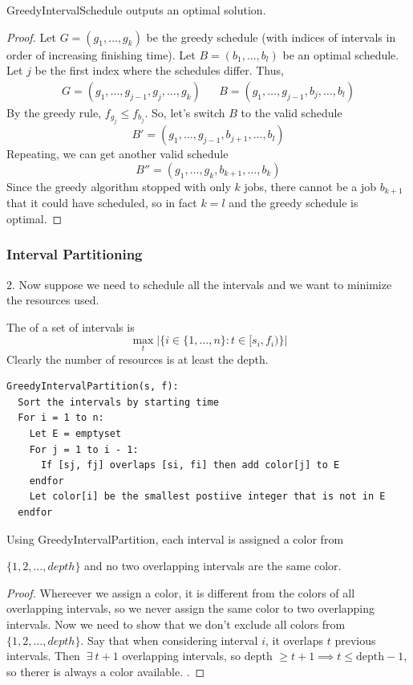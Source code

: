 \documentclass[12pt]{scrartcl}
\begin{document}
\begin{theorem}
  GreedyIntervalSchedule outputs an optimal solution. 
  \begin{proof}
    Let $G = (g_1, \ldots, g_k)$ be the greedy schedule (with indices of intervals in order of increasing finishing time). 
    Let $B = (b_1, \ldots, b_l)$ be an optimal schedule. Let $j$ be the first index where the schedules differ. Thus, 
    \begin{align*}
      G = (g_1, \ldots, g_{j-1}, g_j, \ldots, g_k) && B = (g_1, \ldots, g_{j-1}, b_j, \ldots, b_l)
    \end{align*} 
    By the greedy rule, $f_{g_j} \leq f_{b_j}$. So, let's switch $B$ to the valid schedule
    \[B' = (g_1, \ldots, g_{j-1}, b_{j+1}, \ldots, b_l)\]
    Repeating, we can get another valid schedule 
    \[B'' = (g_1, \ldots, g_k, b_{k+1}, \ldots, b_k)\]
    Since the greedy algorithm stopped with only $k$ jobs, there cannot be a job $b_{k+1}$ that it could have 
    scheduled, so in fact $k = l$ and the greedy schedule is optimal. 
  \end{proof}
\end{theorem}

\subsubsection{Interval Partitioning}

2. Now suppose we need to schedule all the intervals and we want to minimize the resources used. 

\begin{definition}
  The  of a set of intervals is 
  \[\max_t |\{i \in \{1, \ldots, n\} : t \in [s_i, f_i) \}|\]
  Clearly the number of resources is at least the depth. 

\begin{lstlisting}
GreedyIntervalPartition(s, f):
  Sort the intervals by starting time
  For i = 1 to n:
    Let E = emptyset
    For j = 1 to i - 1:
      If [sj, fj] overlaps [si, fi] then add color[j] to E
    endfor
    Let color[i] be the smallest postiive integer that is not in E
  endfor
\end{lstlisting} 
\end{definition}

\begin{theorem}
  Using GreedyIntervalPartition, each interval is assigned a color from 
  
  $\{1, 2, \ldots, depth\}$ and no two overlapping intervals are the same color. 
  \begin{proof}
    Whereever we assign a color, it is different from the colors of all overlapping intervals, so we never 
    assign the same color to two overlapping intervals. Now we need to show that we don't exclude all 
    colors from $\{1, 2, \ldots, depth\}$. Say that when considering interval $i$, it overlaps $t$ previous intervals. 
    Then $\ \exists \ t + 1$ overlapping intervals, so depth $\geq t + 1 \implies t \leq \text{depth} - 1$, so therer 
    is always a color available. . 
  \end{proof}
\end{theorem}
\end{document}
